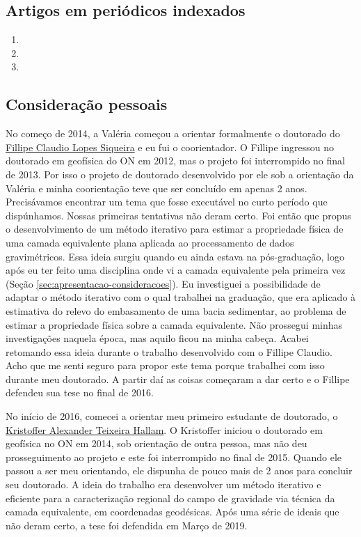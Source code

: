 \subsection*{Artigos em periódicos indexados}

\begin{enumerate}
	\item {}
	\item {}
	\item {}
\end{enumerate}

\subsection*{Consideração pessoais}

No começo de 2014, a Valéria começou a orientar formalmente o doutorado do 
\href{https://lattes.cnpq.br/0467623470950142}{Fillipe Claudio Lopes Siqueira} 
e eu fui o coorientador. 
O Fillipe ingressou no doutorado em geofísica do ON em 2012, mas o projeto foi interrompido
no final de 2013. Por isso o projeto de doutorado desenvolvido por ele sob a orientação da 
Valéria e minha coorientação teve que ser concluído em apenas 2 anos.
Precisávamos encontrar um tema que fosse executável no curto período que dispúnhamos. 
Nossas primeiras tentativas não deram certo. Foi então que propus o desenvolvimento de 
um método
iterativo para estimar a propriedade física de uma camada equivalente plana aplicada ao
processamento de dados gravimétricos.
Essa ideia surgiu quando eu ainda estava na pós-graduação, logo após eu ter feito uma
disciplina onde vi a camada equivalente pela primeira vez 
(Seção \ref{sec:apresentacao-consideracoes}). Eu investiguei a possibilidade de adaptar o
método iterativo com o qual trabalhei na graduação, que era aplicado à estimativa do relevo
do embasamento de uma bacia sedimentar, ao problema de estimar a propriedade física sobre a 
camada equivalente. Não prossegui minhas investigações naquela época, mas aquilo ficou 
na minha cabeça. Acabei retomando essa ideia durante o trabalho desenvolvido 
com o Fillipe Claudio. Acho que me senti seguro para propor este tema porque trabalhei
com isso durante meu doutorado. A partir daí as coisas começaram a dar certo e o Fillipe
defendeu sua tese no final de 2016.

\bigskip

\noindent No início de 2016, comecei a orientar meu primeiro estudante de doutorado,
o \href{https://lattes.cnpq.br/1185423367238423}{Kristoffer Alexander Teixeira Hallam}.
O Kristoffer iniciou o doutorado em geofísica no ON em 2014, sob orientação de outra pessoa,
mas não deu prosseguimento ao projeto e este foi interrompido no final de 2015. 
Quando ele passou a ser meu orientando, ele dispunha de pouco mais de 2 anos para concluir
seu doutorado. A ideia do trabalho era desenvolver um método iterativo e eficiente 
para a caracterização regional do campo de gravidade via técnica da camada equivalente, 
em coordenadas geodésicas. 
Após uma série de ideais que não deram certo, a tese foi defendida em Março de 2019.

